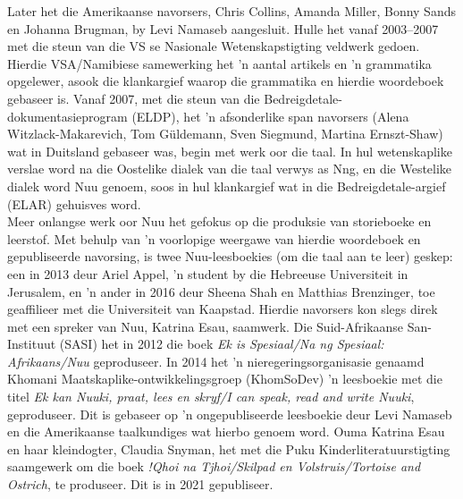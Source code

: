 Later het die Amerikaanse navorsers, Chris Collins, Amanda Miller,
Bonny Sands en Johanna Brugman, by Levi Namaseb aangesluit.  Hulle het
vanaf 2003--2007 met die steun van die VS se Nasionale
Wetenskapstigting veldwerk gedoen. Hierdie VSA/Namibiese samewerking
het 'n aantal artikels en 'n grammatika \parencite{Collins2011}
opgelewer, asook die klankargief waarop die grammatika en hierdie
woordeboek gebaseer is.  Vanaf 2007, met die steun van die
Bedreigdetale-dokumentasieprogram (ELDP), het 'n afsonderlike span
navorsers (Alena Witzlack-Makarevich, Tom G\"{u}ldemann, Sven
Siegmund, Martina Ernszt-Shaw) wat in Duitsland gebaseer was, begin
met werk oor die taal. In hul wetenskaplike verslae word na die
Oostelike dialek van die taal verwys as
N\textipa{\textdoublevertline}ng, en die Westelike dialek word
N\textipa{\textvertline}uu genoem, soos in hul klankargief wat in die
Bedreigdetale-argief (ELAR) gehuisves word.\\

Meer onlangse werk oor N\textipa{\textvertline}uu het gefokus op die
produksie van storieboeke en leerstof. Met behulp van 'n voor\-lopige
weergawe van hierdie woordeboek en gepubliseerde navorsing, is twee
N\textipa{\textvertline}uu-leesboekies (om die taal aan te leer)
geskep: een in 2013 deur Ariel Appel, 'n student by die Hebreeuse
Universiteit in Jerusalem, en 'n ander in 2016 deur Sheena Shah en
Matthias Brenzinger, toe geaffilieer met die Universiteit van
Kaapstad.  Hierdie navorsers kon slegs direk met een spreker van
N\textipa{\textvertline}uu, Katrina Esau, saamwerk.  Die
Suid-Afrikaanse San-Instituut (SASI) het in 2012 die boek \emph{Ek is
Spesiaal/Na ng Spesiaal: Afrikaans/N\textipa{\textvertline}uu}
geproduseer. In 2014 het 'n nieregeringsorganisasie genaamd
\textipa{\textdoublebarpipe}Khomani Maatskaplike-ontwikkelingsgroep
(KhomSoDev) 'n leesboekie met die titel \emph{Ek kan
N\textipa{\textvertline}uuki, praat, lees en skryf/I can speak, read
and write N\textipa{\textvertline}uuki}, geproduseer. Dit is gebaseer
op 'n ongepubliseerde leesboekie deur Levi Namaseb en die Amerikaanse
taalkundiges wat hierbo genoem word. Ouma Katrina Esau en haar
kleindogter, Claudia Snyman, het met die Puku Kinderliteratuurstigting
saamgewerk om die boek \emph{!Qhoi n\textipa{\textvertline}a
Tjhoi/Skilpad en Volstruis/Tortoise and Ostrich}, te produseer. Dit is
in 2021 gepubliseer.\\

